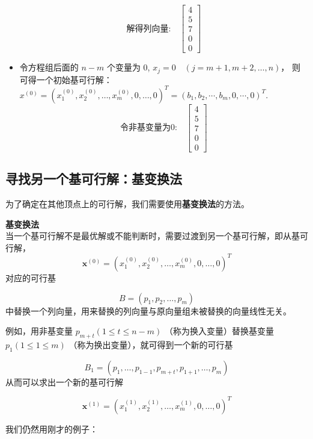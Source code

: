 \begin{itemize}
        \[
        \text{解得列向量:}
        \quad \begin{bmatrix}
        4 \\
        5 \\
        7 \\
        0 \\
        0
        \end{bmatrix}
        \]

        \item 令方程组后面的 $n - m$ 个变量为 0, ${x}_j = 0 \quad (j = m + 1, m + 2, \ldots, n)$，
        则可得一个初始基可行解： 
        ${x}^{(0)} = \left( {x}_1^{(0)}, {x}_2^{(0)}, \ldots, {x}_m^{(0)}, 0, \ldots, 0 \right)^T = \left( {b}_1, {b}_2, \cdots, {b}_m, 0, \cdots, 0 \right)^T$.\\
        \[
        \text{令非基变量为0:}
        \quad \begin{bmatrix}
        4 \\
        5 \\
        7 \\
        0 \\
        0
        \end{bmatrix}
        \]
    \end{itemize}

    \subsection{寻找另一个基可行解：基变换法}
    \label{2.4.2}
    为了确定在其他顶点上的可行解，我们需要使用\textbf{基变换法}的方法。
    \begin{notebox}{\textbf{基变换法}}    
    \\当一个基可行解不是最优解或不能判断时，需要过渡到另一个基可行解，即从基可行解，
    \[
    \mathbf{x}^{(0)} = \left( x_1^{(0)}, x_2^{(0)}, \ldots, x_m^{(0)}, 0, \ldots, 0 \right)^T
    \]
    对应的可行基 

    \[
    B = \left( p_1, p_2, \ldots, p_m \right)
    \]
    中替换一个列向量，用来替换的列向量与原向量组未被替换的向量线性无关。

    例如，用非基变量 \( p_{m+t} \left( 1 \leq t \leq n - m \right) \) （称为换入变量）替换基变量 \( p_1 \left( 1 \leq 1 \leq m \right) \) （称为换出变量），就可得到一个新的可行基

    \[
    B_1 = \left( p_1, \ldots, p_{1-1}, p_{m+t}, p_{1+1}, \ldots, p_m \right)
    \]
    从而可以求出一个新的基可行解

    \[
    \mathbf{x}^{(1)} = \left( x_1^{(1)}, x_2^{(1)}, \ldots, x_m^{(1)}, 0, \ldots, 0 \right)^T
    \]
    \end{notebox}
    我们仍然用刚才的例子：

